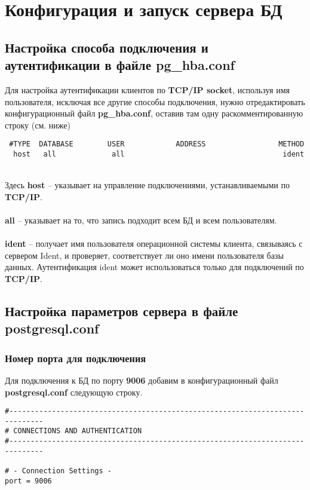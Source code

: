 \documentclass{article}
\begin{document}
\section{Конфигурация и запуск сервера БД}

\subsection{Настройка способа подключения и аутентификации в файле pg\_hba.conf}
Для настройка аутентификации клиентов по \textbf{TCP/IP socket}, используя имя пользователя, исключая все другие способы подключения, нужно отредактировать конфигурационный файл \textbf{pg\_hba.conf}, оставив там одну раскомментированную строку (см. ниже)

\begin{verbatim}
 #TYPE  DATABASE        USER            ADDRESS                 METHOD
  host   all             all                                     ident
\end{verbatim}
\\
Здесь \textbf{host} – указывает на управление подключениями, устанавливаемыми по \textbf{TCP/IP}. \\ \\ 
\textbf{all} – указывает на то, что запись подходит всем БД и всем пользователям. \\ \\ 
\textbf{ident} – получает имя пользователя операционной системы клиента, связываясь с сервером Ident, и проверяет, соответствует ли оно имени пользователя базы данных. Аутентификация ident может использоваться только для подключений по \textbf{TCP/IP}.

\subsection{Настройка параметров сервера в файле postgresql.conf}

\subsubsection{Номер порта для подключения}
Для подключения к БД по порту \textbf{9006} добавим в конфигурационный файл \textbf{postgresql.conf} следующую строку.
\begin{verbatim}
#------------------------------------------------------------------------------
# CONNECTIONS AND AUTHENTICATION
#------------------------------------------------------------------------------

# - Connection Settings -
port = 9006
\end{verbatim}
\end{document}
